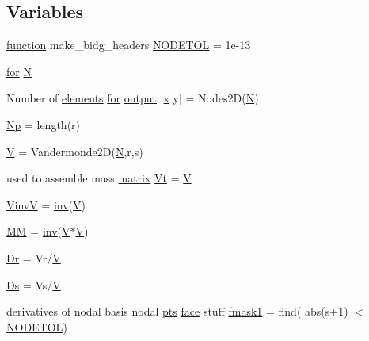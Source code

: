 \subsection*{Variables}
\begin{DoxyCompactItemize}
\item 
\hyperlink{a00611_a2420833d971716e9bab41cc9fb3abba1}{function} make\+\_\+bidg\+\_\+headers \hyperlink{a00473_a459274f44c959d3b6466dbf5c40c6931}{N\+O\+D\+E\+T\+OL} = 1e-\/13
\item 
\hyperlink{a00623_ad1e7380d51df1e0043d24d3c8a860e0a}{for} \hyperlink{a00473_a8a9fa6faadbf3c485ecdc832c0f78989}{N}
\item 
Number of \hyperlink{a00617_aa9aaa650bacb9b91c82437c2ce48f50c}{elements} \hyperlink{a00623_ad1e7380d51df1e0043d24d3c8a860e0a}{for} \hyperlink{a00473_a5913da243070c054a1a9a79e0bdc2bf5}{output} \mbox{[}\hyperlink{a00605_ac98c3bb25378222646e977292011625f}{x} y\mbox{]} = Nodes2D(\hyperlink{a00473_a5b9c4563028063ee53b517cce9aa701b}{N})
\item 
\hyperlink{a00473_abe50207e56666a60c81e2a58f522eea3}{Np} = length(r)
\item 
\hyperlink{a00473_ac0055fa4cdc19a2690bfee3643413a7d}{V} = Vandermonde2D(\hyperlink{a00473_a5b9c4563028063ee53b517cce9aa701b}{N},r,s)
\item 
used to assemble mass \hyperlink{a01014_af07ff1035f34d77764ff516f110e6832}{matrix} \hyperlink{a00473_ae5b77eaf0930991d3654aae29f0fbb39}{Vt} = \hyperlink{a00575_af658e24e5ad7935911c432c5c02d895c}{V}\textquotesingle{}
\item 
\hyperlink{a00473_a8ef32285093ff36729ef70bb1e8149c4}{VinvV} = \hyperlink{a00473_a0c752aad07d6c7e22d2e63df41ccdf8b}{inv}(\hyperlink{a00575_af658e24e5ad7935911c432c5c02d895c}{V})
\item 
\hyperlink{a00473_aa20acbefa603cd69ea23ad09880d6bd8}{MM} = \hyperlink{a00473_a0c752aad07d6c7e22d2e63df41ccdf8b}{inv}(\hyperlink{a00575_af658e24e5ad7935911c432c5c02d895c}{V}$\ast$\hyperlink{a00575_af658e24e5ad7935911c432c5c02d895c}{V}\textquotesingle{})
\item 
\hyperlink{a00473_aa3f5ebfc6bdc8e458334129d39b52461}{Dr} = Vr/\hyperlink{a00575_af658e24e5ad7935911c432c5c02d895c}{V}
\item 
\hyperlink{a00473_ad9a5661d9c2ea85b3143c8ecb7127d5d}{Ds} = Vs/\hyperlink{a00575_af658e24e5ad7935911c432c5c02d895c}{V}
\item 
derivatives of nodal basis nodal \hyperlink{a00473_a7d2fb616b76863109aa80a7ffdfad72b}{pts} \hyperlink{a00611_ac4ec0037ba529da25bf084669a45f60c}{face} stuff \hyperlink{a00473_a1a1dec21df6e8b9d02462f97b957473d}{fmask1} = find( abs(s+1) $<$ \hyperlink{a00575_a409781c62c346e9048df00ae7d289582}{N\+O\+D\+E\+T\+OL})\textquotesingle{}

\end{DoxyCompactItemize}
